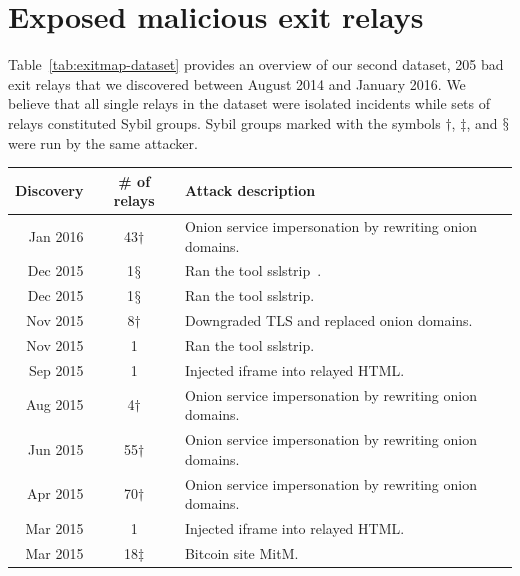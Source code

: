 \appendix

\section{Exposed malicious exit relays}
\label{sec:malicious-relays}
Table~\ref{tab:exitmap-dataset} provides an overview of our second dataset, 205
bad exit relays that we discovered between August 2014 and January 2016.  We
believe that all single relays in the dataset were isolated incidents while sets
of relays constituted Sybil groups.  Sybil groups marked with the symbols
$\dagger$, $\ddagger$, and $\mathsection$ were run by the same attacker.

\begin{table}[t]
\small
\centering
\begin{tabular}{r c p{4cm}}
\textbf{Discovery} & \textbf{\# of relays} & \textbf{Attack description} \\
\hline
Jan 2016 & 43$\dagger$ & Onion service impersonation by rewriting onion domains. \\
Dec 2015 & 1$\mathsection$ & Ran the tool sslstrip~\cite{sslstrip}. \\
Dec 2015 & 1$\mathsection$ & Ran the tool sslstrip. \\
Nov 2015 & 8$\dagger$ & Downgraded TLS and replaced onion domains. \\
Nov 2015 & 1 & Ran the tool sslstrip. \\
Sep 2015 & 1 & Injected iframe into relayed HTML. \\
Aug 2015 & 4$\dagger$ & Onion service impersonation by rewriting onion domains. \\
Jun 2015 & 55$\dagger$ & Onion service impersonation by rewriting onion domains. \\
Apr 2015 & 70$\dagger$ & Onion service impersonation by rewriting onion domains. \\
Mar 2015 & 1 & Injected iframe into relayed HTML. \\
Mar 2015 & 18$\ddagger$ & Bitcoin site MitM. \\

\end{tabular}
\end{table}
